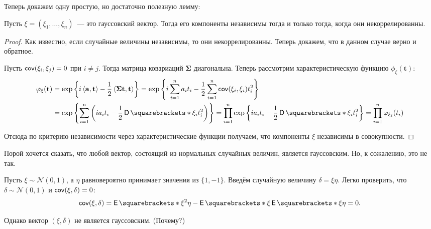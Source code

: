 Теперь докажем одну простую, но достаточно полезную лемму:
\begin{lemma}
	Пусть \(\xi = (\xi_1, \dots, \xi_n)\)~--- это гауссовский вектор. Тогда его 
	компоненты независимы тогда и только тогда, когда они некоррелированны.
\end{lemma}
\begin{proof}
	Как известно, если случайные величины независимы, то они некоррелированны. 
	Теперь докажем, что в данном случае верно и обратное.
	
	Пусть \(\operatorname{\mathsf{cov}}(\xi_i, \xi_j) = 0\) при \(i \neq j\). Тогда матрица ковариаций \(\mathbf{\Sigma}\) диагональна. Теперь рассмотрим характеристическую функцию \(\phi_{\xi}(\mathbf{t})\):
	\begin{align*}
		\phi_{\xi}(\mathbf{t}) &= \exp\left\{i\left\langle \mathbf{a}, \mathbf{t}\right\rangle - \frac{1}{2}\left\langle \mathbf{\Sigma t}, \mathbf{t}\right\rangle\right\} = \exp\left\{i\sum_{i = 1}^{n}a_i t_i - \frac{1}{2}\sum_{i = 1}^{n}\cov(\xi_i, \xi_i)t_i^2\right\} \\
		&= \exp\left\{\sum_{i = 1}^{n}\left(ia_i t_i - \frac{1}{2}\D{\xi_i}t_i^2\right)\right\} = \prod_{i = 1}^{n} \exp\left\{ia_i t_i - \frac{1}{2}\D{\xi_i}t_i^2\right\} = \prod_{i = 1}^{n} \phi_{\xi_i}(t_i)
	\end{align*}
	
	Отсюда по критерию независимости через характеристические функции получаем, что компоненты \(\xi\) независимы в совокупности.
\end{proof}

Порой хочется сказать, что любой вектор, состоящий из нормальных случайных величин, является гауссовским. Но, к сожалению, это не так.
\begin{example}
	Пусть \(\xi \sim \mathcal{N}(0, 1)\), а \(\eta\) равновероятно принимает значения из \(\{1, -1\}\). Введём случайную величину \(\delta = \xi\eta\). Легко проверить, что \(\delta \sim \mathcal{N}(0, 1)\) и \(\operatorname{\mathsf{cov}}(\xi, \delta) = 0\):
	\[
		\cov(\xi, \delta) = \E{\xi^2\eta} - \E{\xi}\E{\xi\eta} = 0.
	\]
	
	Однако вектор \((\xi, \delta)\) не является гауссовским. (Почему?)
\end{example}

